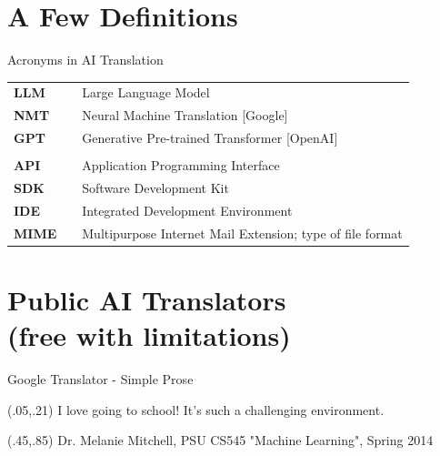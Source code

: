 \documentclass{beamer}
\begin{document}
\section{A Few Definitions}

\begin{frame} {Acronyms in AI Translation}
 \begin{table}
\begin{tabular}{lll}
\textbf{LLM}  &   &    Large Language Model\\
\textbf{NMT}  &   &    Neural Machine Translation [Google] \\
\textbf{GPT } &   &    Generative Pre-trained Transformer	[OpenAI]\\
     &   & \\
\textbf{API}  &   &    Application Programming Interface\\
\textbf{SDK} &    &    Software Development Kit\\
\textbf{IDE } &   &    Integrated Development Environment\\
\textbf{MIME} &  & Multipurpose Internet Mail Extension; type of file format \\
\end{tabular}
\end{table}

\end{frame}

\section{Public AI Translators\\
(free with limitations)}

\begin{frame}{Google Translator - Simple Prose}

\begin{textblock}{1}(.05,.21)
  \normalsize {I love going to school! It's such a challenging environment.}
\end{textblock}\begin{textblock}{1}(.45,.85)
  \tiny{Dr. Melanie Mitchell, PSU CS545 "Machine Learning", Spring 2014}
\end{textblock}


\end{frame}
\end{document}

